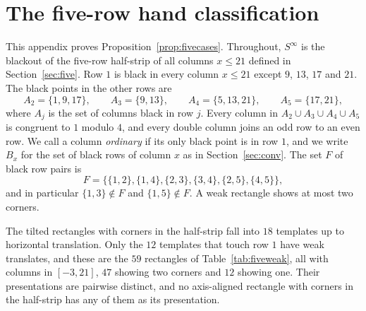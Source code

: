 \section{The five-row hand classification}\label{app:fivecases}

This appendix proves Proposition~\ref{prop:fivecases}. Throughout, $S^{\infty}$ is the
blackout of the five-row half-strip of all columns $x\le21$ defined in
Section~\ref{sec:five}. Row $1$ is black in every column $x\le21$ except $9$, $13$, $17$
and $21$. The black points in the other rows are
\[
A_2=\{1,9,17\},\qquad A_3=\{9,13\},\qquad A_4=\{5,13,21\},\qquad A_5=\{17,21\},
\]
where $A_j$ is the set of columns black in row $j$. Every column in $A_2\cup A_3\cup A_4\cup
A_5$ is congruent to $1$ modulo $4$, and every double column joins an odd row to an even row.
We call a column \emph{ordinary} if its only black point is in row $1$, and we write $B_x$ for
the set of black rows of column $x$ as in Section~\ref{sec:conv}. The set $F$ of black row
pairs is
\[
F=\bigl\{\{1,2\},\{1,4\},\{2,3\},\{3,4\},\{2,5\},\{4,5\}\bigr\},
\]
and in particular $\{1,3\}\notin F$ and $\{1,5\}\notin F$. A weak rectangle shows at most two
corners.

\begin{proposition}\label{prop:fivelist}
The tilted rectangles with corners in the half-strip fall into $18$ templates up to
horizontal translation. Only the $12$ templates that touch row $1$ have weak translates, and
these are the $59$ rectangles of Table~\ref{tab:fiveweak}, all with columns in $[-3,21]$,
$47$ showing two corners and $12$ showing one. Their presentations are pairwise distinct, and no
axis-aligned rectangle with corners in the half-strip has any of them as its presentation.
\end{proposition}

